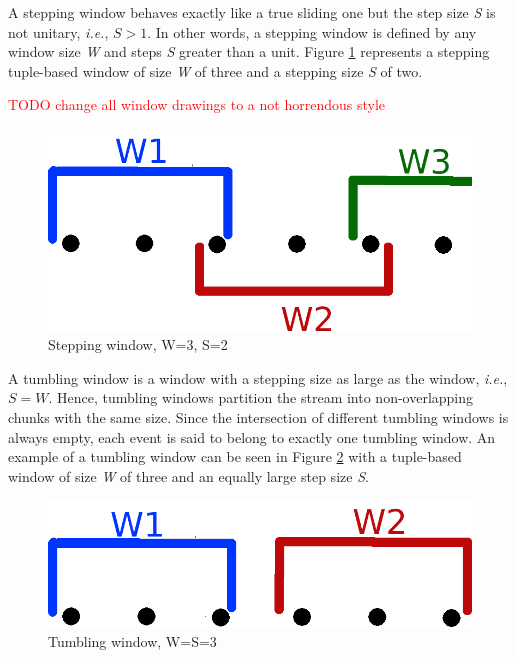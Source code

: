 A stepping window behaves exactly like a true sliding one but the step size \textit{S} is not unitary, \textit{i.e.}, $S > 1$. In other words, a stepping window is defined by any window size \textit{W} and steps \textit{S} greater than a unit. Figure \ref{fig:stepping-window} represents a stepping tuple-based window of size \textit{W} of three and a stepping size \textit{S} of two.

\textcolor{red}{TODO change all window drawings to a not horrendous style}

\begin{figure}[!htb]
    \begin{center}
      \includegraphics[scale=0.3]{figures/stepping.png}
      \caption[Stepping window]{Stepping window, W=3, S=2}
      \label{fig:stepping-window}
    \end{center}
\end{figure}

A tumbling window is a window with a stepping size as large as the window, \textit{i.e.}, $S = W$. Hence, tumbling windows partition the stream into non-overlapping chunks with the same size. Since the intersection of different tumbling windows is always empty, each event is said to belong to exactly one tumbling window. An example of a tumbling window can be seen in Figure \ref{fig:tumbling-window} with a tuple-based window of size \textit{W} of three and an equally large step size \textit{S}.

\begin{figure}[!htb]
    \begin{center}
      \includegraphics[scale=0.3]{figures/tumbling.png}
      \caption[Tumbling window]{Tumbling window, W=S=3}
      \label{fig:tumbling-window}
    \end{center}
\end{figure}

